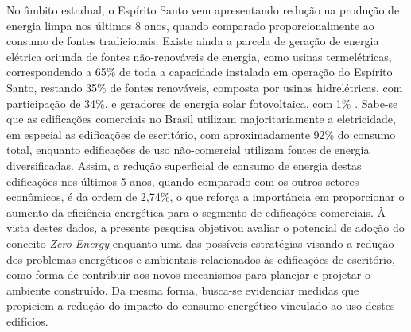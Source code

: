 \begin{onehalfspace}
\noindent No âmbito estadual, o Espírito Santo vem apresentando redução na produção de energia limpa nos últimos 8 anos, quando comparado proporcionalmente ao consumo de fontes tradicionais. Existe ainda a parcela de geração de energia elétrica oriunda de fontes não-renováveis de energia, como usinas termelétricas, correspondendo a 65\% de toda a capacidade instalada em operação do Espírito Santo, restando 35\% de fontes renováveis, composta por usinas hidrelétricas, com participação de 34\%, e  geradores de energia solar fotovoltaica, com 1\% \cite{AgenciadeRegulacaodeServicosPublicosdoEspiritoSanto-ARSP2019,EnergiasdePortugal-EDP2017}.\vspace*{0.3cm} \newline
\noindent Sabe-se que as edificações comerciais no Brasil utilizam majoritariamente a eletricidade, em especial as edificações de escritório, com aproximadamente 92\% do consumo total, enquanto edificações de uso não-comercial utilizam fontes de energia diversificadas. Assim, a redução superficial de consumo de energia destas edificações nos últimos 5 anos, quando comparado com os outros setores econômicos, é da ordem de 2,74\%, o que reforça a importância em proporcionar o aumento da eficiência energética para o segmento de edificações comerciais\cite{AgenciadeRegulacaodeServicosPublicosdoEspiritoSanto-ARSP2018, AgenciadeRegulacaodeServicosPublicosdoEspiritoSanto-ARSP2019, EmpresadePesquisaEnergetica-EPE2018}.\vspace*{0.3cm} \newline
\noindent À vista destes dados, a presente pesquisa objetivou avaliar o potencial de adoção do conceito \textit{Zero Energy} enquanto uma das possíveis estratégias visando a redução dos problemas energéticos e ambientais relacionados às edificações de escritório, como forma de contribuir aos novos mecanismos para planejar e projetar o ambiente construído. Da mesma forma, busca-se evidenciar medidas que propiciem a redução do impacto do consumo energético vinculado ao uso destes edifícios.
\end{onehalfspace}